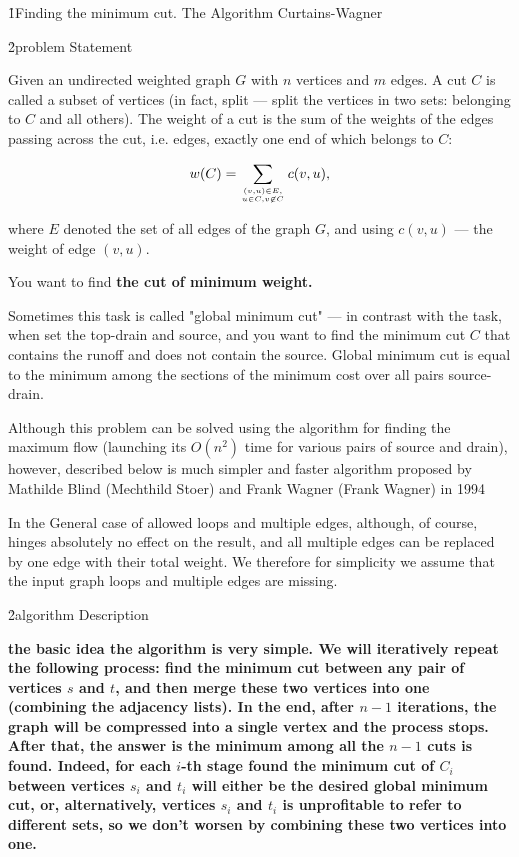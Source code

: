 \h1{Finding the minimum cut. The Algorithm Curtains-Wagner}


\h2{problem Statement}

Given an undirected weighted graph $G$ with $n$ vertices and $m$ edges. A cut $C$ is called a subset of vertices (in fact, split --- split the vertices in two sets: belonging to $C$ and all others). The weight of a cut is the sum of the weights of the edges passing across the cut, i.e. edges, exactly one end of which belongs to $C$:

$$ w(C) = \sum_{(v,u) \in E, \atop u \in C, v \not\in C} c(v,u), $$

where $E$ denoted the set of all edges of the graph $G$, and using $c(v,u)$ --- the weight of edge $(v,u)$.

You want to find \bf{the cut of minimum weight}.

Sometimes this task is called "global minimum cut" --- in contrast with the task, when set the top-drain and source, and you want to find the minimum cut $C$ that contains the runoff and does not contain the source. Global minimum cut is equal to the minimum among the sections of the minimum cost over all pairs source-drain.

Although this problem can be solved using the algorithm for finding the maximum flow (launching its $O(n^2)$ time for various pairs of source and drain), however, described below is much simpler and faster algorithm proposed by Mathilde Blind (Mechthild Stoer) and Frank Wagner (Frank Wagner) in 1994

In the General case of allowed loops and multiple edges, although, of course, hinges absolutely no effect on the result, and all multiple edges can be replaced by one edge with their total weight. We therefore for simplicity we assume that the input graph loops and multiple edges are missing.


\h2{algorithm Description}

\bf{the basic idea} the algorithm is very simple. We will iteratively repeat the following process: find the minimum cut between any pair of vertices $s$ and $t$, and then merge these two vertices into one (combining the adjacency lists). In the end, after $n-1$ iterations, the graph will be compressed into a single vertex and the process stops. After that, the answer is the minimum among all the $n-1$ cuts is found. Indeed, for each $i$-th stage found the minimum cut of $C_i$ between vertices $s_i$ and $t_i$ will either be the desired global minimum cut, or, alternatively, vertices $s_i$ and $t_i$ is unprofitable to refer to different sets, so we don't worsen by combining these two vertices into one.

